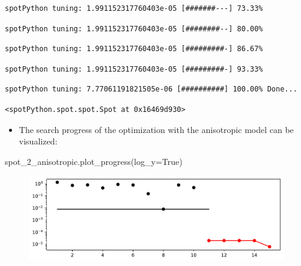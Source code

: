 \documentclass[
  letterpaper,
  DIV=11,
  numbers=noendperiod]{scrreprt}
\newenvironment{Shaded}{\begin{snugshade}}{\end{snugshade}}
\newcommand{\NormalTok}[1]{\textcolor[rgb]{0.00,0.23,0.31}{#1}}
\newcommand{\OperatorTok}[1]{\textcolor[rgb]{0.37,0.37,0.37}{#1}}
\newcommand{\VariableTok}[1]{\textcolor[rgb]{0.07,0.07,0.07}{#1}}
\providecommand{\tightlist}{%
  \setlength{\itemsep}{0pt}\setlength{\parskip}{0pt}}\usepackage{longtable,booktabs,array}
\begin{document}
\begin{verbatim}
spotPython tuning: 1.991152317760403e-05 [#######---] 73.33% 
\end{verbatim}

\begin{verbatim}
spotPython tuning: 1.991152317760403e-05 [########--] 80.00% 
\end{verbatim}

\begin{verbatim}
spotPython tuning: 1.991152317760403e-05 [#########-] 86.67% 
\end{verbatim}

\begin{verbatim}
spotPython tuning: 1.991152317760403e-05 [#########-] 93.33% 
\end{verbatim}

\begin{verbatim}
spotPython tuning: 7.77061191821505e-06 [##########] 100.00% Done...
\end{verbatim}

\begin{verbatim}
<spotPython.spot.spot.Spot at 0x16469d930>
\end{verbatim}

\begin{itemize}
\tightlist
\item
  The search progress of the optimization with the anisotropic model can
  be visualized:
\end{itemize}

\begin{Shaded}
\begin{Highlighting}[]
\NormalTok{spot\_2\_anisotropic.plot\_progress(log\_y}\OperatorTok{=}\VariableTok{True}\NormalTok{)}
\end{Highlighting}
\end{Shaded}

\begin{figure}[H]

{\centering \includegraphics{03_spot_anisotropic_files/figure-pdf/cell-9-output-1.pdf}

}

\end{figure}
\end{document}
